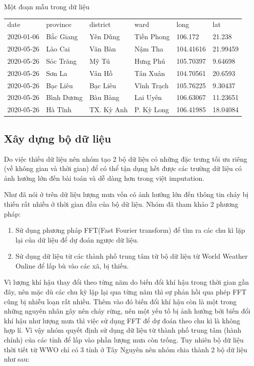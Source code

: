 \documentclass{article}
\begin{document}
Một đoạn mẫu trong dữ liệu
\begin{table}[H]
	\begin{tabular}{llllll}
		date       & province   & district   & ward       & long      & lat      \\
		2020-01-06 & Bắc Giang  & Yên Dũng   & Tiền Phong & 106.172   & 21.238   \\
		2020-05-26 & Lào Cai    & Văn Bàn    & Nậm Tha    & 104.41616 & 21.99459 \\
		2020-05-26 & Sóc Trăng  & Mỹ Tú      & Hưng  Phú  & 105.70397 & 9.64698  \\
		2020-05-26 & Sơn La     & Vân Hồ     & Tân Xuân   & 104.70561 & 20.6593  \\
		2020-05-26 & Bạc Liêu   & Bạc Liêu   & Vĩnh Trạch & 105.76225 & 9.30437  \\
		2020-05-26 & Bình Dương & Bàu Bàng   & Lai Uyên   & 106.63067 & 11.23651 \\
		2020-05-26 & Hà Tĩnh    & TX. Kỳ Anh & P. Kỳ Long & 106.41985 & 18.04084 \\
	\end{tabular}
\end{table}

\subsection{Xây dựng bộ dữ liệu}
Do việc thiếu dữ liệu nên nhóm tạo 2 bộ dữ liệu có những đặc trưng tối ưu riêng (về không gian và thời gian) để có thể tận dụng hết được các trường dữ liệu có ảnh hưởng lớn đến bài toán và dễ dàng hơn trong việt imputation.

Như đã nói ở trên dữ liệu lượng mưa vốn có ảnh hướng lớn đến thông tin cháy bị thiếu rất nhiều ở thời gian đầu của bộ dữ liệu. Nhóm đã tham khảo 2 phương pháp:
\begin{enumerate}
	\item Sử dụng phương pháp FFT(Fast Fourier transform) để tìm ra các chu kì lặp lại của dữ liệu để dự đoán ngược dữ liệu.
	\item Sử dụng dữ liệu từ các thành phố trung tâm từ bộ dữ liệu từ World Weather Online để lấp bù vào các xã, bị thiếu.
\end{enumerate}

Vì lượng khí hậu thay đổi theo từng năm do biến đổi khí hậu trong thời gian gần đây, nên mặc dù các chu kỳ lặp lại qua từng năm thì sự phản hồi qua phép FFT cũng bị nhiễu loạn rất nhiều. Thêm vào đó biến đổi khí hậu còn là một trong những nguyên nhân gây nên cháy rừng, nên một yếu tố bị ảnh hưởng bởi biến đổi khí hậu như lượng mưa thì việc sử dụng FFT để dự đoán theo chu kì là không hợp lí. Vì vậy nhóm quyết định sử dụng dữ liệu từ thành phố trung tâm (hành chính) của các tỉnh để lấp vào phần lượng mưa còn trống. Tuy nhiên bộ dữ liệu thời tiết từ WWO chỉ có 3 tỉnh ở Tây Nguyên nên nhóm chia thành 2 bộ dữ liệu như sau:
\end{document}
